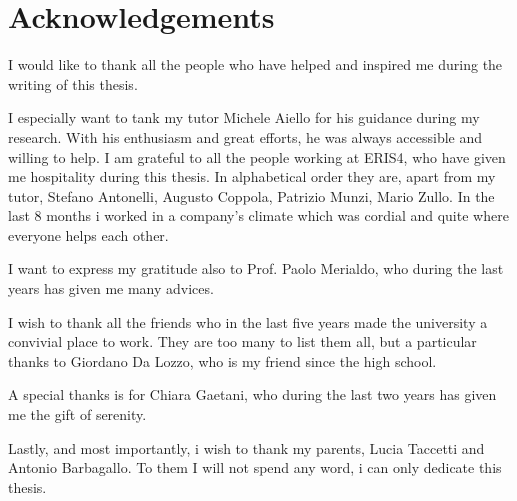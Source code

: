 \chapter{Acknowledgements}
I would like to thank all the people who have helped and inspired me during the writing of this thesis.

I especially want to tank my tutor Michele Aiello for his guidance during my research. With his enthusiasm and great efforts, he was always accessible and willing to help. I am grateful to all the people working at ERIS4, who have given me hospitality during this thesis. In alphabetical order they are, apart from my tutor, Stefano Antonelli, Augusto Coppola, Patrizio Munzi, Mario Zullo. In the last 8 months i worked in a company's climate which was cordial and quite where everyone helps each other.

I want to express my gratitude also to Prof. Paolo Merialdo, who during the last years has given me many advices.

I wish to thank all the friends who in the last five years made the university a convivial place to work. They are too many to list them all, but a particular thanks to Giordano Da Lozzo, who is my friend since the high school.

A special thanks is for Chiara Gaetani, who during the last two years has given me the gift of serenity.

Lastly, and most importantly, i wish to thank my parents, Lucia Taccetti and Antonio Barbagallo. To them I will not spend any word, i can only dedicate this thesis.

